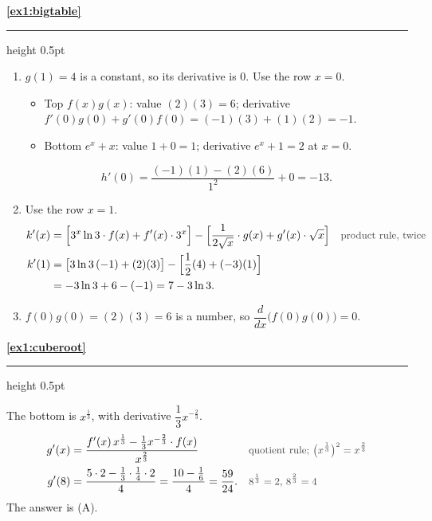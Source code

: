 \documentclass[11pt,a4paper]{article}
\newcommand{\solitem}[2]{%
 \par\addvspace{16pt}\Needspace{10\baselineskip}%
 {\large\bfseries \ref{#1}}\par\nobreak\vspace{2pt}%
 {\color{rulegray}\hrule height 0.5pt}\nobreak\vspace{7pt}%
 #2\par}
\newcommand{\why}[1]{\text{\small\color{darkgray}#1}}
\begin{document}
\solitem{ex1:bigtable}{%
\begin{enumerate}[label=(\alph*)]
 \item $g(1)=4$ is a constant, so its derivative is $0$. Use the row $x=0$.
 \begin{itemize}
  \item Top $f(x)g(x)$: value $(2)(3)=6$; derivative $f'(0)g(0)+g'(0)f(0)=(-1)(3)+(1)(2)=-1$.
  \item Bottom $e^x+x$: value $1+0=1$; derivative $e^x+1=2$ at $x=0$.
 \end{itemize}
 \[
 h'(0)=\frac{(-1)(1)-(2)(6)}{1^2}+0=-13.
 \]
 \item Use the row $x=1$.
 \begin{align*}
 k'(x)&=\Bigl[3^x\ln3\cdot f(x)+f'(x)\cdot3^x\Bigr]-\Bigl[\frac{1}{2\sqrt x}\cdot g(x)+g'(x)\cdot\sqrt x\Bigr] &&\why{product rule, twice}\\
 k'(1)&=\bigl[3\ln3\,(-1)+(2)(3)\bigr]-\Bigl[\frac12(4)+(-3)(1)\Bigr]\\
 &=-3\ln3+6-(-1)=7-3\ln3.
 \end{align*}
 \item $f(0)g(0)=(2)(3)=6$ is a number, so $\dfrac{d}{dx}\bigl(f(0)g(0)\bigr)=0$.
\end{enumerate}
}

\solitem{ex1:cuberoot}{%
The bottom is $x^{\frac13}$, with derivative $\dfrac13x^{-\frac23}$.
\begin{align*}
g'(x)&=\frac{f'(x)\,x^{\frac13}-\frac13x^{-\frac23}\cdot f(x)}{x^{\frac23}} &&\why{quotient rule; $\bigl(x^{\frac13}\bigr)^2=x^{\frac23}$}\\
g'(8)&=\frac{5\cdot2-\frac13\cdot\frac14\cdot2}{4}=\frac{10-\frac16}{4}=\frac{59}{24}. &&\why{$8^{\frac13}=2$, $8^{\frac23}=4$}
\end{align*}
The answer is (A).
}
\end{document}
